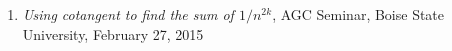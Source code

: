 \documentclass[12pt]{article}
\begin{document}
\begin{enumerate}[revarabic]
\item \textit{Using cotangent to find the sum of $1/n^{2k}$},
AGC Seminar, Boise State University, February 27, 2015

\end{enumerate}
\end{document}
